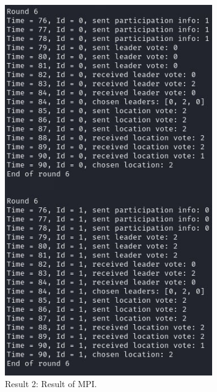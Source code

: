 \documentclass{article}
\begin{document}
\begin{figure}[h]
  \centering
  \includegraphics[width=0.8\textwidth]{Result_MPI.png}
  \caption{Result 2: Result of MPI.}
\end{figure}
\end{document}

